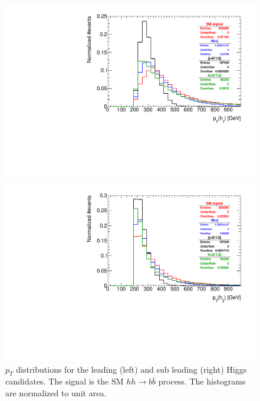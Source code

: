 \begin{figure}
	\centering
	\begin{minipage}{.5\textwidth}
		\centering
		\includegraphics[trim={.65cm 0 0 0},clip,width=\linewidth]{./Figures/hist_h1_pt.pdf}
	\end{minipage}%
	\begin{minipage}{.5\textwidth}
		\centering
		\includegraphics[trim={0 0 .65cm 0},clip,width=\linewidth]{./Figures/hist_h2_pt.pdf}
	\end{minipage}
	\label{fig:h1h2_pt}
	\caption{$p_T$ distributions for the leading (left) and sub leading (right) Higgs candidates. The signal is the SM $hh\rightarrow b\overline{b}$ process. The histograms are normalized to unit area.}
\end{figure}

